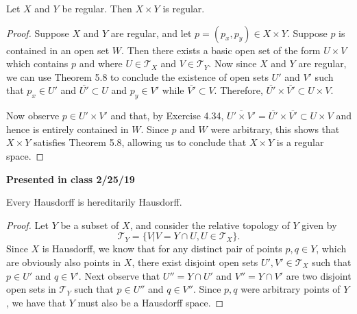\documentclass[a4paper,12pt,twoside]{hmcpset}
\begin{document}
\begin{problem}[Theorem 5.17] Let $X$ and $Y$ be regular. Then $X
    \times Y$ is regular.
\end{problem}

\begin{proof}
    Suppose $X$ and $Y$ are regular, and let $p = (p_x, p_y) \in X
    \times Y$. Suppose $p$ is contained in an open set $W$.
    Then there exists a basic open set of the form $U \times V$ which
    contains $p$ and where $U \in \mathscr{T}_X$ and $V \in
    \mathscr{T}_Y$. Now since $X$ and $Y$ are regular, we can use
    Theorem 5.8 to conclude the existence of open sets $U'$ and $V'$
    such that $p_x \in U'$ and $\overline{U'} \subset U$ and $p_y \in
    V'$ while $\overline{V'} \subset V$. Therefore, $\overline{U'}
    \times \overline{V'} \subset U \times V$.
    
    Now observe $p \in U' \times
    V'$ and that, by Exercise 4.34, $\overline{U'
    \times V'} = \overline{U'}\times\overline{V'} \subset U \times V$
    and hence is entirely
    contained in $W$. Since $p$ and $W$ were arbitrary, this shows
    that $X \times Y$ satisfies Theorem 5.8, allowing us to conclude
    that $X \times Y$ is a regular space. 
\end{proof}

\noindent
\textbf{Presented in class 2/25/19}\\
\begin{problem}[Theorem 5.19] Every Hausdorff is hereditarily
    Hausdorff. 
\end{problem}

\begin{proof}
    Let $Y$ be a subset of $X$, and consider the relative topology of
    $Y$ given by $$\mathscr{T}_Y = \{V | V = Y \cap U, U \in
    \mathscr{T}_X\}.$$ Since $X$ is Hausdorff, we know that for any
    distinct pair of points 
    $p, q \in Y$, which are obviously also points in $X$, there exist
    disjoint open sets $U', V' \in \mathscr{T}_X$ such that $p \in U'$
    and $q \in V'$. Next observe that $U'' = Y \cap U'$ and $V'' = Y
    \cap V'$ are two disjoint open sets in $\mathscr{T}_Y$ such that
    $p \in U''$ and $q \in V''$. Since $p, q$ were arbitrary points of
    $Y$, we have that $Y$ must also be a Hausdorff space. 
\end{proof}
\end{document}
